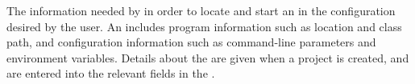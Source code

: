 \item[AUT Configuration]{
The information needed by \gd in order to locate and start an \gdaut{} in the configuration desired by the user.
An  includes program information such as  location and class path, and \gdaut configuration information such as command-line parameters and environment variables. Details  about the \gdaut are given when a project is created, and are entered into the relevant
fields in the \gdsuiteeditor{}.  
}
